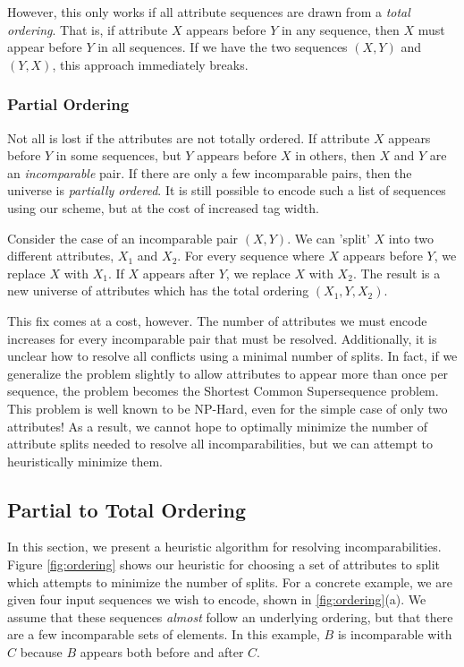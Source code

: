 However, this only works if all attribute sequences are drawn from a \textit{total ordering}. That is, if attribute $X$ appears before $Y$ in any sequence, then $X$ must appear before $Y$ in all sequences. If we have the two sequences $(X, Y)$ and $(Y, X)$, this approach immediately breaks.

\subsubsection{Partial Ordering}
Not all is lost if the attributes are not totally ordered. If attribute $X$ appears before $Y$ in some sequences, but $Y$ appears before $X$ in others, then $X$ and $Y$ are an \textit{incomparable} pair. If there are only a few incomparable pairs, then the universe is \textit{partially ordered}. It is still possible to encode such a list of sequences using our scheme, but at the cost of increased tag width.

Consider the case of an incomparable pair $(X,Y)$. We can 'split' $X$ into two different attributes, $X_1$ and $X_2$. For every sequence where $X$ appears before $Y$, we replace $X$ with $X_1$. If $X$ appears after $Y$, we replace $X$ with $X_2$. The result is a new universe of attributes which has the total ordering $(X_1, Y, X_2)$. 

This fix comes at a cost, however. The number of attributes we must encode increases for every incomparable pair that must be resolved. Additionally, it is unclear how to resolve all conflicts using a minimal number of splits. In fact, if we generalize the problem slightly to allow attributes to appear more than once per sequence, the problem becomes the Shortest Common Supersequence problem. This problem is well known to be NP-Hard, even for the simple case of only two attributes! As a result, we cannot hope to optimally minimize the number of attribute splits needed to resolve all incomparabilities, but we can attempt to heuristically minimize them.

\subsection{Partial to Total Ordering}
In this section, we present a heuristic algorithm for resolving incomparabilities.
 Figure \ref{fig:ordering} shows our heuristic for choosing a set of attributes to split which attempts to minimize the number of splits. For a concrete example, we are given four input sequences we wish to encode, shown in \ref{fig:ordering}(a). We assume that these sequences \textit{almost} follow an underlying ordering, but that there are a few incomparable sets of elements. In this example, $B$ is incomparable with $C$ because $B$ appears both before and after $C$. 

